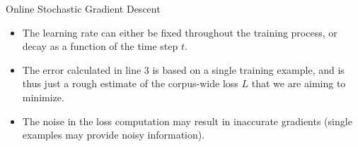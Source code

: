 \documentclass[handout]{beamer}
\begin{document}
\begin{frame}{Online Stochastic Gradient Descent}


\begin{scriptsize}
\begin{itemize}
\item The learning rate can either be fixed throughout the
training process, or decay as a function of the time step $t$.
\item  The error calculated in line 3 is based on a single training example, and is thus just a rough estimate of the corpus-wide loss $L$ that we are aiming to minimize. 
\item The noise in the loss computation may result in inaccurate gradients (single examples may provide noisy information).

\end{itemize}


\end{scriptsize}

\end{frame}
\end{document}
